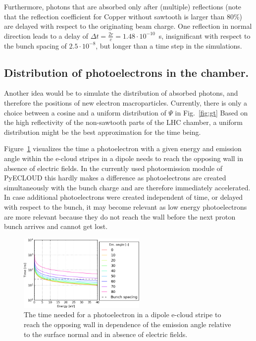 Furthermore, photons that are absorbed only after (multiple) reflections (note that the reflection coefficient for Copper without sawtooth is larger than 80\%) are delayed with respect to the originating beam charge.
One reflection in normal direction leads to a delay of $\Delta t = \frac{2r}{c} = 1.48\cdot10^{-10}$~s, insignificant with respect to the bunch spacing of $2.5\cdot10^{-8}$, but longer than a time step in the simulations.

\subsection{Distribution of photoelectrons in the chamber.}

Another idea would be to simulate the distribution of absorbed photons, and therefore the positions of new electron macroparticles.
Currently, there is only a choice between a cosine and a uniform distribution of $\Psi$ in Fig.~\ref{fig:gt}
Based on the high reflectivity of the non-sawtooth parts of the LHC chamber, a uniform distribution might be the best approximation for the time being.

Figure~\ref{fig:time} visualizes the time a photoelectron with a given energy and emission angle within the e-cloud stripes in a dipole needs to reach the opposing wall in absence of electric fields.
In the currently used photoemission module of PyECLOUD this hardly makes a difference as photoelectrons are created simultaneously with the bunch charge and are therefore immediately accelerated.
In case additional photoelectrons were created independent of time, or delayed with respect to the bunch, it may become relevant as low energy photoelectrons are more relevant because they do not reach the wall before the next proton bunch arrives and cannot get lost.

\begin{figure}[tbh]
    \centering
    \includegraphics[width=0.55\textwidth]{../plots/time.png}
    \caption{The time needed for a photoelectron in a dipole e-cloud stripe to reach the opposing wall in dependence of the emission angle relative to the surface normal and in absence of electric fields.}
    \label{fig:time}
\end{figure}


